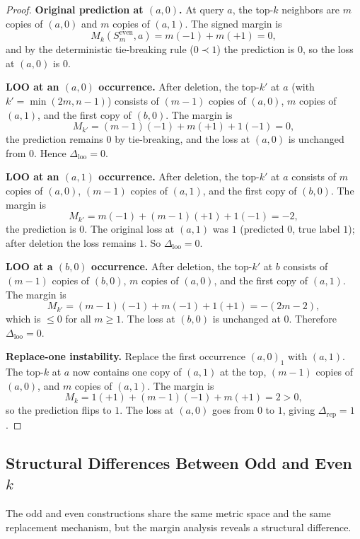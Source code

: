\begin{proof}
\textbf{Original prediction at $(a,0)$.} At query $a$, the top-$k$ neighbors are $m$ copies of $(a,0)$ and $m$ copies of $(a,1)$. The signed margin is
\[
M_k(S_m^{\text{even}}, a) = m(-1) + m(+1) = 0,
\]
and by the deterministic tie-breaking rule ($0 \prec 1$) the prediction is $0$, so the loss at $(a,0)$ is $0$.

\textbf{LOO at an $(a,0)$ occurrence.} After deletion, the top-$k'$ at $a$ (with $k' = \min(2m, n-1)$) consists of $(m-1)$ copies of $(a,0)$, $m$ copies of $(a,1)$, and the first copy of $(b,0)$. The margin is
\[
M_{k'} = (m-1)(-1) + m(+1) + 1(-1) = 0,
\]
the prediction remains $0$ by tie-breaking, and the loss at $(a,0)$ is unchanged from $0$. Hence $\Delta_{\mathrm{loo}} = 0$.

\textbf{LOO at an $(a,1)$ occurrence.} After deletion, the top-$k'$ at $a$ consists of $m$ copies of $(a,0)$, $(m-1)$ copies of $(a,1)$, and the first copy of $(b,0)$. The margin is
\[
M_{k'} = m(-1) + (m-1)(+1) + 1(-1) = -2,
\]
the prediction is $0$. The original loss at $(a,1)$ was $1$ (predicted $0$, true label $1$); after deletion the loss remains $1$. So $\Delta_{\mathrm{loo}} = 0$.

\textbf{LOO at a $(b,0)$ occurrence.} After deletion, the top-$k'$ at $b$ consists of $(m-1)$ copies of $(b,0)$, $m$ copies of $(a,0)$, and the first copy of $(a,1)$. The margin is
\[
M_{k'} = (m-1)(-1) + m(-1) + 1(+1) = -(2m-2),
\]
which is $\le 0$ for all $m \ge 1$. The loss at $(b,0)$ is unchanged at $0$. Therefore $\Delta_{\mathrm{loo}} = 0$.

\textbf{Replace-one instability.} Replace the first occurrence $(a,0)_1$ with $(a,1)$. The top-$k$ at $a$ now contains one copy of $(a,1)$ at the top, $(m-1)$ copies of $(a,0)$, and $m$ copies of $(a,1)$. The margin is
\[
M_k = 1(+1) + (m-1)(-1) + m(+1) = 2 > 0,
\]
so the prediction flips to $1$. The loss at $(a,0)$ goes from $0$ to $1$, giving $\Delta_{\mathrm{rep}} = 1$.
\end{proof}

\subsection{Structural Differences Between Odd and Even $k$}

The odd and even constructions share the same metric space and the same
replacement mechanism, but the margin analysis reveals a structural difference.

